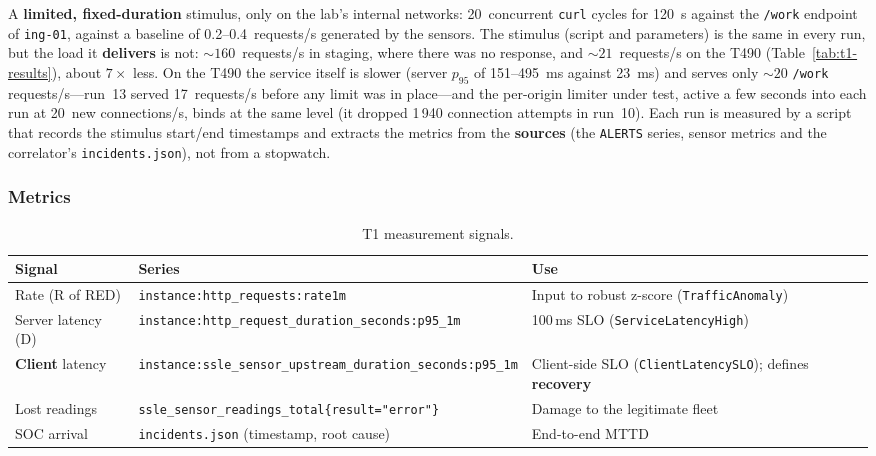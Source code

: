 \documentclass[11pt,a4paper]{article}
\begin{document}
A \textbf{limited, fixed-duration} stimulus, only on the lab's internal networks:
20~concurrent \texttt{curl} cycles for 120~s against the \texttt{/work} endpoint of
\texttt{ing-01}, against a baseline of 0.2--0.4~requests/s generated by the sensors. The
stimulus (script and parameters) is the same in every run, but the load it
\textbf{delivers} is not: ${\sim}160$~requests/s in staging, where there was no response,
and ${\sim}21$~requests/s on the T490 (Table~\ref{tab:t1-results}), about $7\times$ less.
On the T490 the service itself is slower (server $p_{95}$ of 151--495~ms against 23~ms) and
serves only ${\sim}20$ \texttt{/work} requests/s---run~13 served 17~requests/s before any
limit was in place---and the per-origin limiter under test, active a few seconds into each
run at 20~new connections/s, binds at the same level (it dropped 1\,940 connection attempts
in run~10). Each run is measured by a script that records the stimulus start/end timestamps
and extracts the metrics from the \textbf{sources} (the \texttt{ALERTS} series, sensor
metrics and the correlator's \texttt{incidents.json}), not from a stopwatch.

\subsubsection{Metrics}

\begin{table}[H]
  \centering
  \caption{T1 measurement signals.}
  \small
  \begin{tabular}{@{}p{2.2cm}p{5.8cm}p{5.5cm}@{}}
    \toprule
    \textbf{Signal} & \textbf{Series} & \textbf{Use} \\
    \midrule
    Rate (R of RED) & \texttt{instance:http\_requests:rate1m} &
      Input to robust z-score (\texttt{TrafficAnomaly}) \\
    Server latency (D) & \texttt{instance:http\_request\_\allowbreak duration\_seconds:p95\_1m} &
      100\,ms SLO (\texttt{ServiceLatencyHigh}) \\
    \textbf{Client} latency & \texttt{instance:ssle\_sensor\_\allowbreak upstream\_duration\_seconds:\allowbreak p95\_1m} &
      Client-side SLO (\texttt{ClientLatencySLO}); defines \textbf{recovery} \\
    Lost readings & \texttt{ssle\_sensor\_readings\_total\allowbreak\{result="error"\}} &
      Damage to the legitimate fleet \\
    SOC arrival & \texttt{incidents.json} (timestamp, root cause) &
      End-to-end MTTD \\
    \bottomrule
  \end{tabular}
\end{table}
\end{document}
